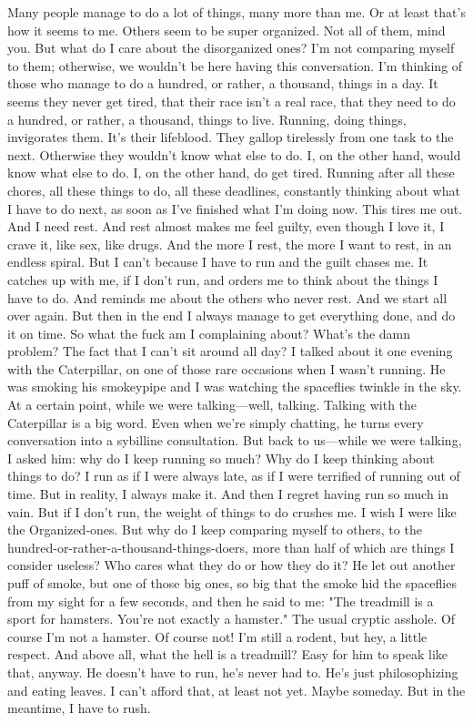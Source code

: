 {Many people manage to do a lot of things, many more than me. Or at least that's how it seems to me. Others seem to be super organized. Not all of them, mind you. But what do I care about the disorganized ones? I'm not comparing myself to them; otherwise, we wouldn't be here having this conversation. I'm thinking of those who manage to do a hundred, or rather, a thousand, things in a day. It seems they never get tired, that their race isn't a real race, that they need to do a hundred, or rather, a thousand, things to live. Running, doing things, invigorates them. It's their lifeblood. They gallop tirelessly from one task to the next. Otherwise they wouldn't know what else to do. I, on the other hand, would know what else to do. I, on the other hand, do get tired. Running after all these chores, all these things to do, all these deadlines, constantly thinking about what I have to do next, as soon as I've finished what I'm doing now. This tires me out. And I need rest. And rest almost makes me feel guilty, even though I love it, I crave it, like sex, like drugs. And the more I rest, the more I want to rest, in an endless spiral. But I can't because I have to run and the guilt chases me. It catches up with me, if I don't run, and orders me to think about the things I have to do. And reminds me about the others who never rest. And we start all over again.
But then in the end I always manage to get everything done, and do it on time. So what the fuck am I complaining about? What's the damn problem? The fact that I can't sit around all day? I talked about it one evening with the Caterpillar, on one of those rare occasions when I wasn't running. He was smoking his smokeypipe and I was watching the spaceflies twinkle in the sky. At a certain point, while we were talking—well, talking. Talking with the Caterpillar is a big word. Even when we're simply chatting, he turns every conversation into a sybilline consultation. But back to us—while we were talking, I asked him: why do I keep running so much? Why do I keep thinking about things to do? I run as if I were always late, as if I were terrified of running out of time. But in reality, I always make it. And then I regret having run so much in vain. But if I don't run, the weight of things to do crushes me. I wish I were like the Organized-ones. But why do I keep comparing myself to others, to the hundred-or-rather-a-thousand-things-doers, more than half of which are things I consider useless? Who cares what they do or how they do it? He let out another puff of smoke, but one of those big ones, so big that the smoke hid the spaceflies from my sight for a few seconds, and then he said to me: "The treadmill is a sport for hamsters. You're not exactly a hamster." The usual cryptic asshole. Of course I'm not a hamster. Of course not! I'm still a rodent, but hey, a little respect. And above all, what the hell is a treadmill?
Easy for him to speak like that, anyway. He doesn't have to run, he's never had to. He's just philosophizing and eating leaves. I can't afford that, at least not yet. Maybe someday. But in the meantime, I have to rush.}

